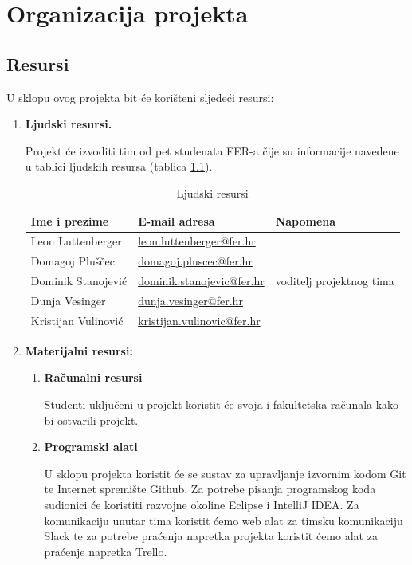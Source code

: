 \documentclass[times, utf8, numeric]{fer}
\begin{document}
\chapter{Organizacija projekta}
\section{Resursi}
U sklopu ovog projekta bit će korišteni sljedeći resursi:
\begin{enumerate}
	\item \begin{flushleft}\textbf{Ljudski resursi.}\end{flushleft}
	Projekt će izvoditi tim od pet studenata FER-a čije su informacije navedene u tablici ljudskih resursa (tablica 			\ref{table:ljudstvo}).
	
	\begin{table}[H]
	\centering
 	\begin{tabular}{|l l l|} 
 	\hline
 	Ime i prezime & E-mail adresa & Napomena\\ [0.5ex] 
	\hline
 	Leon Luttenberger & \href{mailto:leon.luttenberger@fer.hr}{leon.luttenberger@fer.hr} & \\
 	Domagoj Pluščec & \href{mailto:domagoj.pluscec@fer.hr}{domagoj.pluscec@fer.hr} & \\
 	Dominik Stanojević & \href{mailto:dominik.stanojevic@fer.hr}{dominik.stanojevic@fer.hr} & 
 	voditelj projektnog tima\\
 	Dunja Vesinger & \href{mailto:dunja.vesinger@fer.hr}{dunja.vesinger@fer.hr} & \\
 	Kristijan Vulinović & \href{mailto:kristijan.vulinovic@fer.hr}{kristijan.vulinovic@fer.hr} & \\
 	\hline
 	\end{tabular}
 	\caption{Ljudski resursi}
	\label{table:ljudstvo}
	\end{table}
	
	\item \begin{flushleft}\textbf{ Materijalni resursi:} \end{flushleft}
	\begin{enumerate}
		\item \begin{flushleft}\textbf{Računalni resursi}\end{flushleft}
		Studenti uključeni u projekt koristit će svoja i fakultetska računala kako bi ostvarili projekt.
		
		\item \begin{flushleft}\textbf{Programski alati}\end{flushleft}
		U sklopu projekta koristit će se sustav za upravljanje izvornim kodom Git te Internet spremište 				Github. Za potrebe pisanja programskog koda sudionici će koristiti razvojne okoline Eclipse i IntelliJ IDEA. Za komunikaciju unutar tima koristit ćemo web alat za timsku komunikaciju Slack te za potrebe 	praćenja napretka projekta koristit ćemo alat za praćenje napretka Trello.
\end{enumerate}
\end{enumerate}
\end{document}
